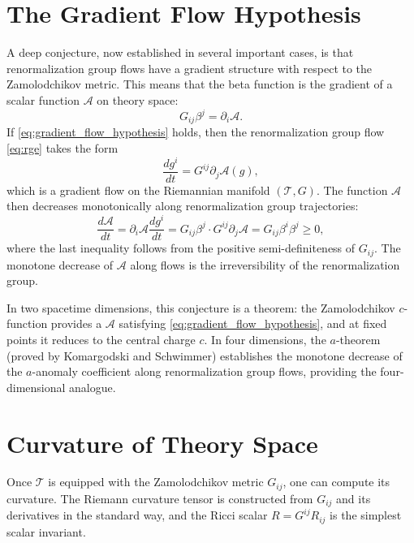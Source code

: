 \documentclass[11pt, twoside, openright]{book}
\theoremstyle{dotted}
\theoremstyle{definition}
\newcommand{\cT}{\mathcal{T}}          %
\begin{document}
\section{The Gradient Flow Hypothesis}

A deep conjecture, now established in several important cases, is that
renormalization group flows have a gradient structure with respect to the
Zamolodchikov metric. This means that the beta function is the gradient of a
scalar function $\mathcal{A}$ on theory space:
\begin{equation}
  G_{ij}\beta^j = \partial_i \mathcal{A}.
  \label{eq:gradient_flow_hypothesis}
\end{equation}
If \eqref{eq:gradient_flow_hypothesis} holds, then the renormalization group flow
\eqref{eq:rge} takes the form
\begin{equation}
  \frac{dg^i}{dt} = G^{ij}\partial_j \mathcal{A}(g),
  \label{eq:rg_gradient_flow}
\end{equation}
which is a gradient flow on the Riemannian manifold $(\cT, G)$. The function
$\mathcal{A}$ then decreases monotonically along renormalization group trajectories:
\begin{equation}
  \frac{d\mathcal{A}}{dt} = \partial_i \mathcal{A} \frac{dg^i}{dt}
  = G_{ij}\beta^j \cdot G^{ij}\partial_j\mathcal{A} = G_{ij}\beta^i\beta^j \geq 0,
  \label{eq:monotone_A}
\end{equation}
where the last inequality follows from the positive semi-definiteness of $G_{ij}$.
The monotone decrease of $\mathcal{A}$ along flows is the irreversibility of the
renormalization group.

In two spacetime dimensions, this conjecture is a theorem: the Zamolodchikov
$c$-function provides a $\mathcal{A}$ satisfying \eqref{eq:gradient_flow_hypothesis},
and at fixed points it reduces to the central charge $c$. In four dimensions,
the $a$-theorem (proved by Komargodski and Schwimmer) establishes the monotone
decrease of the $a$-anomaly coefficient along renormalization group flows, providing
the four-dimensional analogue.

\section{Curvature of Theory Space}

Once $\cT$ is equipped with the Zamolodchikov metric $G_{ij}$, one can compute
its curvature. The Riemann curvature tensor is constructed from $G_{ij}$ and its
derivatives in the standard way, and the Ricci scalar $R = G^{ij}R_{ij}$ is the
simplest scalar invariant.
\end{document}
